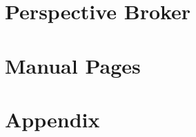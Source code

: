 \documentclass[oneside]{book}
\begin{document}



\chapter{Perspective Broker}






\chapter{Manual Pages}


\clearpage

\clearpage

\clearpage

\clearpage

\clearpage


\chapter{Appendix}



\end{document}
